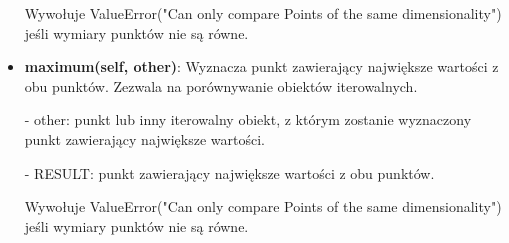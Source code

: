 \documentclass{lab}
\begin{document}
\begin{itemize}
    Wywołuje ValueError("Can only compare Points of the same dimensionality") jeśli wymiary punktów nie są równe.

    \item \textbf{maximum(self, other)}:
    Wyznacza punkt zawierający największe wartości z obu punktów. Zezwala na porównywanie obiektów iterowalnych.

    - other: punkt lub inny iterowalny obiekt, z którym zostanie wyznaczony punkt zawierający największe wartości.

    - RESULT: punkt zawierający największe wartości z obu punktów.
    
    Wywołuje ValueError("Can only compare Points of the same dimensionality") jeśli wymiary punktów nie są równe.    
\end{itemize}
\end{document}
